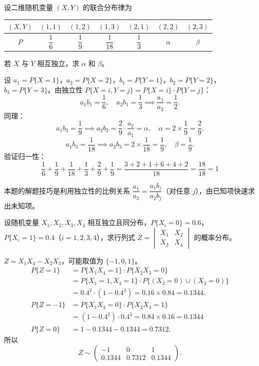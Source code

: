 \documentclass[lang=cn,11pt]{elegantbook}
\begin{document}
\begin{exercise}[由独立性求未知参数] \label{exer:3-3c}
设二维随机变量 $(X,Y)$ 的联合分布律为
\begin{center}
\begin{tabular}{c|cccccc}
\toprule
$(X,Y)$ & $(1,1)$ & $(1,2)$ & $(1,3)$ & $(2,1)$ & $(2,2)$ & $(2,3)$ \\
\midrule
$P$ & $\dfrac{1}{6}$ & $\dfrac{1}{9}$ & $\dfrac{1}{18}$ & $\dfrac{1}{3}$ & $\alpha$ & $\beta$ \\
\bottomrule
\end{tabular}
\end{center}
若 $X$ 与 $Y$ 相互独立，求 $\alpha$ 和 $\beta$。
\end{exercise}
\begin{solution}
设 $a_1 = P\{X=1\}$，$a_2 = P\{X=2\}$，$b_1 = P\{Y=1\}$，$b_2 = P\{Y=2\}$，$b_3 = P\{Y=3\}$。由独立性 $P\{X=i, Y=j\} = P\{X=i\} \cdot P\{Y=j\}$：
\[
a_1 b_1 = \frac{1}{6}, \quad a_2 b_1 = \frac{1}{3} \implies \frac{a_1}{a_2} = \frac{1}{2}.
\]
同理：
\[
a_1 b_2 = \frac{1}{9} \implies a_2 b_2 = \frac{2}{9} \cdot \frac{a_2}{a_1} = \alpha, \quad \alpha = 2 \times \frac{1}{9} = \frac{2}{9}.
\]
\[
a_1 b_3 = \frac{1}{18} \implies a_2 b_3 = 2 \times \frac{1}{18} = \frac{1}{9}, \quad \beta = \frac{1}{9}.
\]
验证归一性：\[\dfrac{1}{6} + \dfrac{1}{9} + \dfrac{1}{18} + \dfrac{1}{3} + \dfrac{2}{9} + \dfrac{1}{9} = \dfrac{3+2+1+6+4+2}{18} = \dfrac{18}{18} = 1\]
\begin{note}
本题的解题技巧是利用独立性的比例关系 $\dfrac{a_1}{a_2} = \dfrac{a_1 b_j}{a_2 b_j}$（对任意 $j$），由已知项快速求出未知项。
\end{note}
\end{solution}

\begin{exercise}[行列式分布] \label{exer:3-c6}
设随机变量 $X_1, X_2, X_3, X_4$ 相互独立且同分布，$P\{X_i=0\} = 0.6$，$P\{X_i=1\} = 0.4$（$i=1,2,3,4$），求行列式 $Z = \begin{vmatrix} X_1 & X_2 \\ X_3 & X_4 \end{vmatrix}$ 的概率分布。
\end{exercise}
\begin{solution}
$Z = X_1X_4 - X_2X_3$，可能取值为 $\{-1, 0, 1\}$。
\begin{align*}
P\{Z=1\} &= P\{X_1X_4=1\}\cdot P\{X_2X_3=0\}\\
& = P\{X_1=1,X_4=1\}\cdot P\{(X_2=0)\cup(X_3=0)\}\\
&= 0.4^2 \cdot (1-0.4^2) = 0.16 \times 0.84 = 0.1344.\\
P\{Z=-1\} &= P\{X_1X_4=0\}\cdot P\{X_2X_3=1\} \\
&= (1-0.4^2)\cdot 0.4^2 = 0.84 \times 0.16 = 0.1344\\
P\{Z=0\} &= 1 - 0.1344 - 0.1344 = 0.7312.
\end{align*}
所以
\[
Z \sim \begin{pmatrix} -1 & 0 & 1 \\ 0.1344 & 0.7312 & 0.1344 \end{pmatrix}.
\]
\end{solution}
\end{document}
